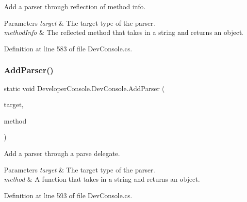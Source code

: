 Add a parser through reflection of method info. 


\begin{DoxyParams}{Parameters}
{\em target} & The target type of the parser. \\
\hline
{\em method\+Info} & The reflected method that takes in a string and returns an object. \\
\hline
\end{DoxyParams}


Definition at line 583 of file Dev\+Console.\+cs.

\mbox{\label{class_developer_console_1_1_dev_console_abc72c2f73347121d6b25f06f0591584f}} 
\subsubsection{\texorpdfstring{Add\+Parser()}{AddParser()}\hspace{0.1cm}{\footnotesize\ttfamily [2/3]}}
{\footnotesize\ttfamily static void Developer\+Console.\+Dev\+Console.\+Add\+Parser (\begin{DoxyParamCaption}\item[{Type}]{target,  }\item[{\hyperlink{namespace_developer_console_a62e10d7e4aeed7c6bcd4a780468c74fa}{Parse\+Delegate}}]{method }\end{DoxyParamCaption})\hspace{0.3cm}{\ttfamily [static]}}



Add a parser through a parse delegate. 


\begin{DoxyParams}{Parameters}
{\em target} & The target type of the parser. \\
\hline
{\em method} & A function that takes in a string and returns an object. \\
\hline
\end{DoxyParams}


Definition at line 593 of file Dev\+Console.\+cs.

\mbox{\label{class_developer_console_1_1_dev_console_a4183b27cc77ec3b4aad8bdc9f11c33b8}} 
